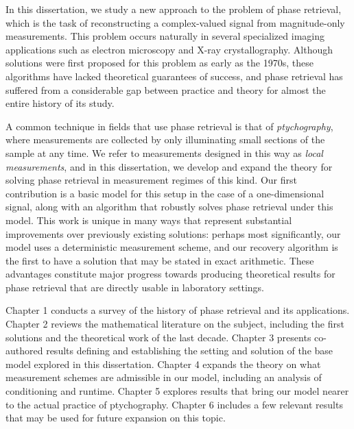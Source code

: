In this dissertation, we study a new approach to the problem of phase retrieval, which is the task of reconstructing a complex-valued signal from magnitude-only measurements.  This problem occurs naturally in several specialized imaging applications such as electron microscopy and X-ray crystallography.  Although solutions were first proposed for this problem as early as the 1970s, these algorithms have lacked theoretical guarantees of success, and phase retrieval has suffered from a considerable gap between practice and theory for almost the entire history of its study.

A common technique in fields that use phase retrieval is that of \emph{ptychography}, where measurements are collected by only illuminating small sections of the sample at any time.  We refer to measurements designed in this way as \emph{local measurements}, and in this dissertation, we develop and expand the theory for solving phase retrieval in measurement regimes of this kind.  Our first contribution is a basic model for this setup in the case of a one-dimensional signal, along with an algorithm that robustly solves phase retrieval under this model.  This work is unique in many ways that represent substantial improvements over previously existing solutions: perhaps most significantly, our model uses a deterministic measurement scheme, and our recovery algorithm is the first to have a solution that may be stated in exact arithmetic.  These advantages constitute major progress towards producing theoretical results for phase retrieval that are directly usable in laboratory settings.

Chapter 1 conducts a survey of the history of phase retrieval and its applications.  Chapter 2 reviews the mathematical literature on the subject, including the first solutions and the theoretical work of the last decade.  Chapter 3 presents co-authored results defining and establishing the setting and solution of the base model explored in this dissertation.  Chapter 4 expands the theory on what measurement schemes are admissible in our model, including an analysis of conditioning and runtime.  Chapter 5 explores results that bring our model nearer to the actual practice of ptychography.  Chapter 6 includes a few relevant results that may be used for future expansion on this topic.




